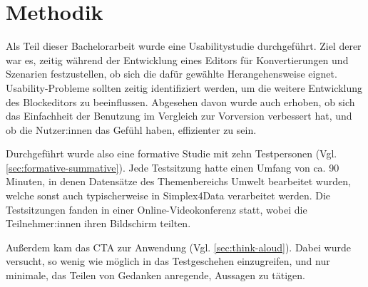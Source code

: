 \section{Methodik}

Als Teil dieser Bachelorarbeit wurde eine Usabilitystudie durchgeführt. Ziel derer war es, zeitig während der Entwicklung eines Editors für Konvertierungen und Szenarien festzustellen, ob sich die dafür gewählte Herangehensweise eignet. Usability-Probleme sollten zeitig identifiziert werden, um die weitere Entwicklung des Blockeditors zu beeinflussen. Abgesehen davon wurde auch erhoben, ob sich das Einfachheit der Benutzung im Vergleich zur Vorversion verbessert hat, und ob die Nutzer:innen das Gefühl haben, effizienter zu sein.

Durchgeführt wurde also eine formative Studie mit zehn Testpersonen (Vgl. \ref{sec:formative-summative}). Jede Testsitzung hatte einen Umfang von ca. 90 Minuten, in denen Datensätze des Themenbereichs Umwelt bearbeitet wurden, welche sonst auch typischerweise in Simplex4Data verarbeitet werden. Die Testsitzungen fanden in einer Online-Videokonferenz statt, wobei die Teilnehmer:innen ihren Bildschirm teilten.

Außerdem kam das \acf{CTA} zur Anwendung (Vgl. \ref{sec:think-aloud}). Dabei wurde versucht, so wenig wie möglich in das Testgeschehen einzugreifen, und nur minimale, das Teilen von Gedanken anregende, Aussagen zu tätigen.
